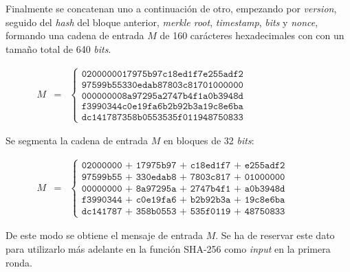 \documentclass{article}
\begin{document}
    Finalmente se concatenan uno a continuación de otro, empezando por \textit{version}, seguido del \textit{hash} del bloque anterior, \textit{merkle root}, \textit{timestamp}, \textit{bits} y \textit{nonce}, formando una cadena de entrada $M$ de 160 carácteres hexadecimales con con un tamaño total de 640 \textit{bits}.
    
    \begin{figure}[H]
    \centering
        $\begin{array}{rcl}
             M & = & \left \{
            \begin{array}{c}
                \texttt{0200000017975b97c18ed1f7e255adf2} \\
                \texttt{97599b55330edab87803c81701000000} \\
                \texttt{000000008a97295a2747b4f1a0b3948d} \\
                \texttt{f3990344c0e19fa6b2b92b3a19c8e6ba} \\
                \texttt{dc141787358b0553535f011948750833}
            \end{array}
            \right .
        \end{array}$
    \end{figure}
    
    Se segmenta la cadena de entrada $M$ en bloques de 32 \textit{bits}:
    \begin{figure}[H]
    \centering
        $\begin{array}{rcl}
             M & = & \left \{
            \begin{array}{c}
                \texttt{02000000 + 17975b97 + c18ed1f7 + e255adf2} \\
                \texttt{97599b55 + 330edab8 + 7803c817 + 01000000} \\
                \texttt{00000000 + 8a97295a + 2747b4f1 + a0b3948d} \\
                \texttt{f3990344 + c0e19fa6 + b2b92b3a + 19c8e6ba} \\
                \texttt{dc141787 + 358b0553 + 535f0119 + 48750833}
            \end{array}
            \right .
        \end{array}$
    \end{figure}
    
    De este modo se obtiene el mensaje de entrada $M$. Se ha de reservar este dato para utilizarlo más adelante en la función SHA-256 como \textit{input} en la primera ronda.
    
\end{document}
